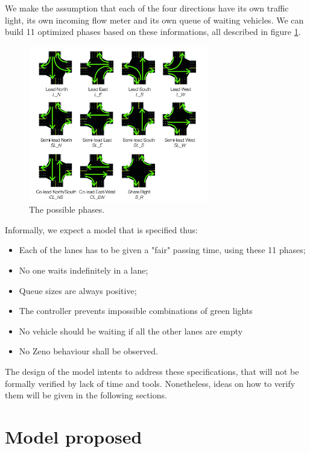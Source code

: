 \documentclass[paper=a4, fontsize=11pt]{scrartcl}
\numberwithin{figure}{section}			%
\numberwithin{table}{section}				%
\begin{document}
We make the assumption that each of the four directions have its own traffic light, its own incoming flow meter and its own queue of waiting vehicles. We can build 11 optimized phases based on these informations, all described in figure \ref{possibilities}.

\begin{figure}[!ht]
    \center
    \includegraphics[width=0.7\textwidth]{./images/possibilities.jpg}
    \caption{\label{possibilities} The possible phases.}
\end{figure}

Informally, we expect a model that is specified thus:
\begin{itemize}
\item Each of the lanes has to be given a "fair" passing time, using these 11 phases;
\item No one waits indefinitely in a lane;
\item Queue sizes are always positive;
\item The controller prevents impossible combinations of green lights
\item No vehicle should be waiting if all the other lanes are empty
\item No Zeno behaviour shall be observed.
\end{itemize}

The design of the model intents to address these specifications, that will not be formally verified by lack of time and tools. Nonetheless, ideas on how to verify them will be given in the following sections.

\section{Model proposed}
\end{document}
